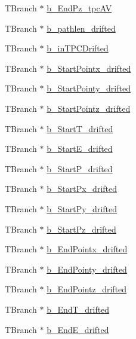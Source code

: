 \begin{DoxyCompactItemize}
\item 
T\-Branch $\ast$ \hyperlink{classanatree_a4d2f3d8f17a29f09e97573ef718ca792}{b\-\_\-\-End\-Pz\-\_\-tpc\-A\-V}
\item 
T\-Branch $\ast$ \hyperlink{classanatree_a72b1921b93bb0d96afb74018ab2dc285}{b\-\_\-pathlen\-\_\-drifted}
\item 
T\-Branch $\ast$ \hyperlink{classanatree_a12a7a9ee541344d1f07cc96eae7af63a}{b\-\_\-in\-T\-P\-C\-Drifted}
\item 
T\-Branch $\ast$ \hyperlink{classanatree_aac01ca332b7a048d93d905c56422fc2a}{b\-\_\-\-Start\-Pointx\-\_\-drifted}
\item 
T\-Branch $\ast$ \hyperlink{classanatree_a7fa962a9deea8be0924a7a917ec312e3}{b\-\_\-\-Start\-Pointy\-\_\-drifted}
\item 
T\-Branch $\ast$ \hyperlink{classanatree_a682ef0689db26bad01179fcc1ccf3651}{b\-\_\-\-Start\-Pointz\-\_\-drifted}
\item 
T\-Branch $\ast$ \hyperlink{classanatree_a3a88ec3c4d33b3776456f84b47f9743e}{b\-\_\-\-Start\-T\-\_\-drifted}
\item 
T\-Branch $\ast$ \hyperlink{classanatree_ab891a28553d7e4ab7a165b01297d7aa1}{b\-\_\-\-Start\-E\-\_\-drifted}
\item 
T\-Branch $\ast$ \hyperlink{classanatree_a04fdecba4c95c6c84f4986a7541c9ccd}{b\-\_\-\-Start\-P\-\_\-drifted}
\item 
T\-Branch $\ast$ \hyperlink{classanatree_a1fb8c7f6311e701256acde6c6896ea2f}{b\-\_\-\-Start\-Px\-\_\-drifted}
\item 
T\-Branch $\ast$ \hyperlink{classanatree_a1dca49cc8749dda0eaf01eb0fd860afc}{b\-\_\-\-Start\-Py\-\_\-drifted}
\item 
T\-Branch $\ast$ \hyperlink{classanatree_aecbf099b8a893fa767397d12cd202ec7}{b\-\_\-\-Start\-Pz\-\_\-drifted}
\item 
T\-Branch $\ast$ \hyperlink{classanatree_abcdcf46dfd88b689f71c675acd9cc4a2}{b\-\_\-\-End\-Pointx\-\_\-drifted}
\item 
T\-Branch $\ast$ \hyperlink{classanatree_a55f8d2c4402b7f6e8b3e215c52578312}{b\-\_\-\-End\-Pointy\-\_\-drifted}
\item 
T\-Branch $\ast$ \hyperlink{classanatree_ac28ff5abc693b93d4426863036c5a023}{b\-\_\-\-End\-Pointz\-\_\-drifted}
\item 
T\-Branch $\ast$ \hyperlink{classanatree_a490287619d8e9c1901c0bb5d873a153b}{b\-\_\-\-End\-T\-\_\-drifted}
\item 
T\-Branch $\ast$ \hyperlink{classanatree_aacd9326557fb4368b09d1b266a6d966d}{b\-\_\-\-End\-E\-\_\-drifted}

\end{DoxyCompactItemize}
